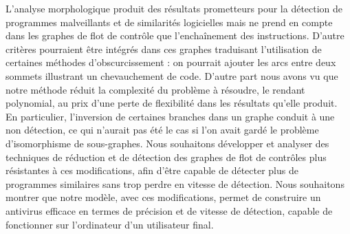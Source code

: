L'analyse morphologique produit des résultats prometteurs pour la détection de programmes malveillants et de similarités logicielles mais ne prend en compte dans les graphes de flot de contrôle que l'enchaînement des instructions. D'autre critères pourraient être intégrés dans ces graphes traduisant l'utilisation de certaines méthodes d'obscurcissement : on pourrait ajouter les arcs entre deux sommets illustrant un chevauchement de code.
D'autre part nous avons vu que notre méthode réduit la complexité du problème à résoudre, le rendant polynomial, au prix d'une perte de flexibilité dans les résultats qu'elle produit.
En particulier, l'inversion de certaines branches  dans un graphe conduit à une non détection, ce qui n'aurait pas été le cas si l'on avait gardé le problème d'isomorphisme de sous-graphes.
Nous souhaitons développer et analyser des techniques de réduction et de détection des graphes de flot de contrôles plus résistantes à ces modifications, afin d'être capable de détecter plus de programmes similaires sans trop perdre en vitesse de détection.
Nous souhaitons montrer que notre modèle, avec ces modifications, permet de construire un antivirus efficace en termes de précision et de vitesse de détection, capable de fonctionner sur l'ordinateur d'un utilisateur final.


